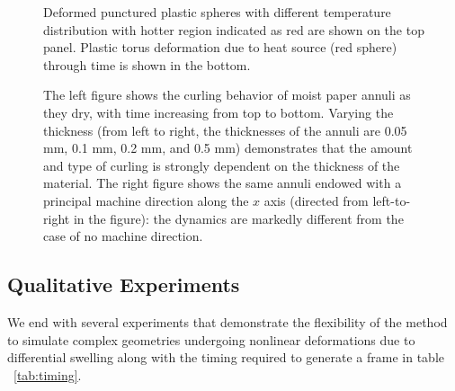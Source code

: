 \documentclass[timestamp,acmtog]{acmart}
\begin{document}
\begin{figure}[!h]
\begin{minipage}[t]{0.45\linewidth}
    \caption{Deformed punctured plastic spheres with different temperature distribution with hotter region indicated as red are shown on the top panel. Plastic torus deformation due to heat source (red sphere) through time is shown in the bottom. }
    \label{fig:TorusandSphere}
\end{minipage}        
\end{figure}

\begin{figure}[h]
  \centering
  \caption{The left figure shows the curling behavior of moist paper annuli as they dry, with time increasing from top to bottom. Varying the thickness (from left to right, the thicknesses of the annuli are 0.05 mm, 0.1 mm, 0.2 mm, and 0.5 mm) demonstrates that the amount and type of curling is strongly dependent on the thickness of the material. The right figure shows the same annuli endowed with a principal machine direction along the $x$ axis (directed from left-to-right in the figure): the dynamics are markedly different from the case of no machine direction. }
  \label{Annuli}
\end{figure}

\subsection{Qualitative Experiments}
We end with several experiments that demonstrate the flexibility of the method to simulate complex geometries undergoing nonlinear deformations due to differential swelling along with the timing required to generate a frame in table ~\ref{tab:timing}.
\end{document}
